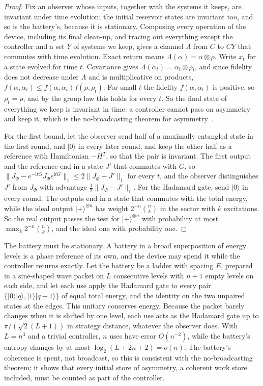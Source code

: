 \begin{proof}
Fix an observer whose inputs, together with the systems it keeps, are invariant under time evolution; the initial reservoir states are invariant too, and so is the battery's, because it is stationary. Composing every operation of the device, including its final clean-up, and tracing out everything except the controller and a set $Y$ of systems we keep, gives a channel $\Lambda$ from $C$ to $CY$ that commutes with time evolution. Exact return means $\Lambda(\alpha)=\alpha\otimes\rho$. Write $x_t$ for a state evolved for time $t$. Covariance gives $\Lambda(\alpha_t)=\alpha_t\otimes\rho_t$, and since fidelity does not decrease under $\Lambda$ and is multiplicative on products, $f(\alpha,\alpha_t)\le f(\alpha,\alpha_t)f(\rho,\rho_t)$. For small $t$ the fidelity $f(\alpha,\alpha_t)$ is positive, so $\rho_t=\rho$, and by the group law this holds for every $t$. So the final state of everything we keep is invariant in time: a controller cannot pass on asymmetry and keep it, which is the no-broadcasting theorem for asymmetry~\cite{MarvianSpekkens19,LostaglioMuller19}.

For the first bound, let the observer send half of a maximally entangled state in the first round, and $|0\rangle$ in every later round, and keep the other half as a reference with Hamiltonian $-H^T$, so that the pair is invariant. The first output and the reference end in a state $J'$ that commutes with $G$, so $\|J_\Phi-e^{-\mathrm itG}J_\Phi e^{\mathrm itG}\|_1\le2\|J_\Phi-J'\|_1$ for every $t$, and the observer distinguishes $J'$ from $J_\Phi$ with advantage $\tfrac12\|J_\Phi-J'\|_1$. For the Hadamard gate, send $|0\rangle$ in every round. The outputs end in a state that commutes with the total energy, while the ideal output $|+\rangle^{\otimes n}$ has weight $2^{-n}\binom nk$ in the sector with $k$ excitations. So the real output passes the test for $|+\rangle^{\otimes n}$ with probability at most $\max_k2^{-n}\binom nk$, and the ideal one with probability one.
\end{proof}

The battery must be stationary. A battery in a broad superposition of energy levels is a phase reference of its own, and the device may spend it while the controller returns exactly. Let the battery be a ladder with spacing $E$, prepared in a sine-shaped wave packet on $L$ consecutive levels with $n+1$ empty levels on each side, and let each use apply the Hadamard gate to every pair $\{|0\rangle|q\rangle,|1\rangle|q-1\rangle\}$ of equal total energy, and the identity on the two unpaired states at the edges. This unitary conserves energy. Because the packet barely changes when it is shifted by one level, each use acts as the Hadamard gate up to $\pi/(\sqrt2(L+1))$ in strategy distance, whatever the observer does. With $L=n^3$ and a trivial controller, $n$ uses have error $O(n^{-2})$, while the battery's entropy changes by at most $\log_2(L+2n+2)=o(n)$. The battery's coherence is spent, not broadcast, so this is consistent with the no-broadcasting theorem; it shows that every initial store of asymmetry, a coherent work store included, must be counted as part of the controller.

